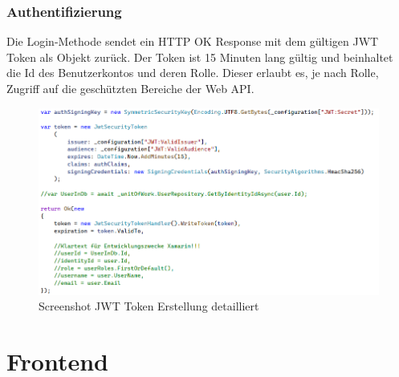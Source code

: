\newpage
\subsubsection{Authentifizierung}
\author{Stefano Pyringer}
Die Login-Methode sendet ein HTTP OK Response mit dem gültigen JWT Token als Objekt zurück. 
Der Token ist 15 Minuten lang gültig und beinhaltet die Id des Benutzerkontos und deren Rolle. 
Dieser erlaubt es, je nach Rolle, Zugriff auf die geschützten Bereiche der Web API.

\begin{figure}[!h]
    \includegraphics*[width=15cm]{./pics/screenshot_jwt_create.png}
    \caption[JWT create]{Screenshot JWT Token Erstellung detailliert}
\end{figure}

\newpage
\section{Frontend}
\author{Mirzet Sakonjic}
